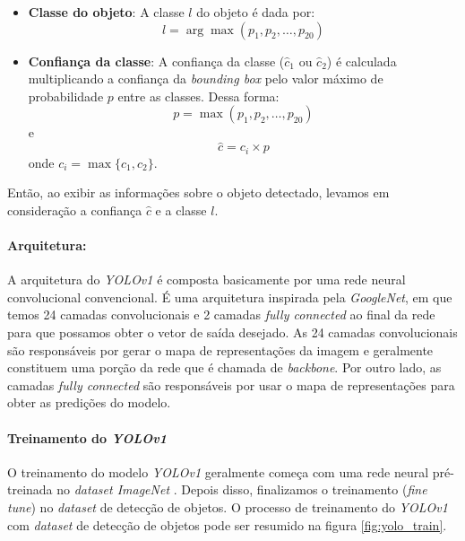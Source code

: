 \begin{itemize}
    \item \textbf{Classe do objeto}: A classe \( l \) do objeto é dada por:
   $$
   l = \arg\max(p_1, p_2, \dots, p_{20})
   $$

    \item \textbf{Confiança da classe}: A confiança da classe (\( \hat{c}_1 \) ou \( \hat{c}_2 \)) é calculada multiplicando a confiança da \emph{bounding box} pelo valor máximo de probabilidade \( p \) entre as classes. Dessa forma:
       $$
       p = \max(p_1, p_2, \dots, p_{20})
       $$
       e
       $$
       \hat{c} = c_i \times p
       $$
       onde $c_i = \max\{c_1, c_2\}$.
\end{itemize}
Então, ao exibir as informações sobre o objeto detectado, levamos em consideração a confiança $\hat{c}$ e a classe $l$. 

\paragraph{Arquitetura:} A arquitetura do \emph{YOLOv1} é composta basicamente por uma rede neural convolucional convencional. É uma arquitetura inspirada pela \emph{GoogleNet}, em que temos 24 camadas convolucionais e 2 camadas \emph{fully connected} ao final da rede para que possamos obter o vetor de saída desejado. As 24 camadas convolucionais são responsáveis por gerar o mapa de representações da imagem e geralmente constituem uma porção da rede que é chamada de \emph{backbone}. Por outro lado, as camadas \emph{fully connected} são responsáveis por usar o mapa de representações para obter as predições do modelo.

\paragraph{Treinamento do \emph{YOLOv1}}
O treinamento do modelo \emph{YOLOv1} geralmente começa com uma rede neural pré-treinada no \emph{dataset ImageNet} \citep{imagenet}. Depois disso, finalizamos o treinamento (\emph{fine tune}) no \emph{dataset} de detecção de objetos. O processo de treinamento do \emph{YOLOv1} com \emph{dataset} de detecção de objetos pode ser resumido na figura \ref{fig:yolo_train}.

